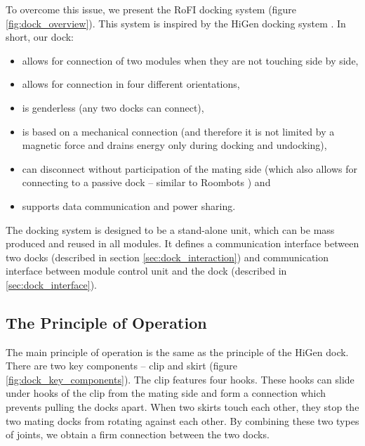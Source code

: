 To overcome this issue, we present the RoFI docking system (figure
\ref{fig:dock_overview}). This system is inspired by the HiGen docking
system \cite{parrott_higen:_2014}. In short, our dock:
\begin{itemize}
    \item allows for connection of two modules when they are not touching side
    by side,
    \item allows for connection in four different orientations,
    \item is genderless (any two docks can connect),
    \item is based on a mechanical connection (and therefore it is not
    limited by a magnetic force and drains energy only during docking and
    undocking),
    \item can disconnect without participation of the mating side (which also
    allows for connecting to a passive dock -- similar to Roombots
    \cite{bonardi_locomotion_2012}) and
    \item supports data communication and power sharing.
\end{itemize}

The docking system is designed to be a stand-alone unit, which can be mass
produced and reused in all modules. It defines a communication interface between
two docks (described in section \ref{sec:dock_interaction}) and communication
interface between module control unit and the dock (described in
\ref{sec:dock_interface}).

\subsection{The Principle of Operation}

The main principle of operation is the same as the principle of the HiGen dock.
There are two key components -- clip and skirt (figure
\ref{fig:dock_key_components}). The clip features four hooks. These hooks can
slide under hooks of the clip from the mating side and form a connection which
prevents pulling the docks apart. When two skirts touch each other, they stop
the two mating docks from rotating against each other. By combining these two
types of joints, we obtain a firm connection between the two docks.

